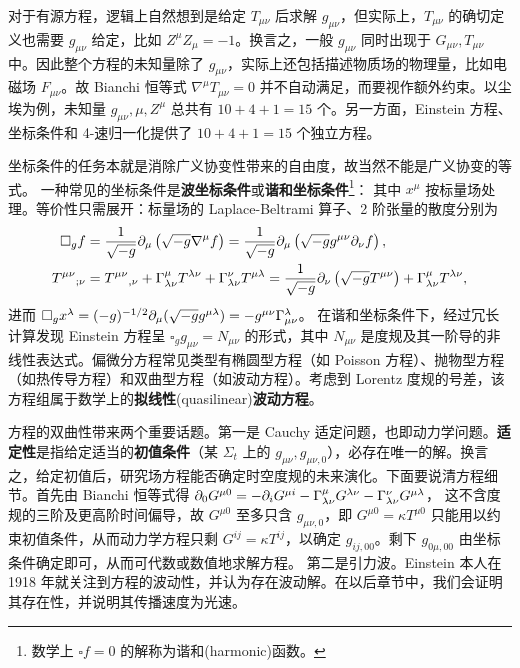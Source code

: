 对于有源方程，逻辑上自然想到是给定 $T_{\mu\nu}$ 后求解 $g_{\mu\nu}$，但实际上，$T_{\mu\nu}$ 的确切定义也需要 $g_{\mu\nu}$ 给定，比如 $Z^\mu Z_\mu = -1$。换言之，一般 $g_{\mu\nu}$ 同时出现于 $G_{\mu\nu},T_{\mu\nu}$ 中。因此整个方程的未知量除了 $g_{\mu\nu}$，实际上还包括描述物质场的物理量，比如电磁场 $F_{\mu\nu}$。故 Bianchi 恒等式 $\nabla^\mu T_{\mu\nu}=0$ 并不自动满足，而要视作额外约束。以尘埃为例，未知量 $g_{\mu\nu},\mu,Z^\mu$ 总共有 $10+4+1=15$ 个。另一方面，Einstein 方程、坐标条件和 4-速归一化提供了 $10+4+1=15$ 个独立方程。

坐标条件的任务本就是消除广义协变性带来的自由度，故当然不能是广义协变的等式。
一种常见的坐标条件是\textbf{波坐标条件}或\textbf{谐和坐标条件}\footnote{数学上 $\square f = 0$ 的解称为谐和(harmonic)函数。}：
其中 $x^\mu$ 按标量场处理。等价性只需展开：标量场的 Laplace-Beltrami 算子、2 阶张量的散度分别为
\begin{align}
    \square_g f&=\frac{1}{\sqrt{-g}} \partial_\mu\left(\sqrt{-g} \nabla^\mu f\right)=\frac{1}{\sqrt{-g}} \partial_\mu\left(\sqrt{-g} g^{\mu\nu}\partial_\nu f\right),\\ 
T^{\mu \nu}{}_{;\nu}&=T^{\mu \nu}{}_{,\nu}+\Gamma_{\lambda \nu}^\mu T^{\lambda \nu}+\Gamma_{\lambda \nu}^\nu T^{\mu \lambda}
=\frac{1}{\sqrt{-g}} \partial_\nu\left(\sqrt{-g} T^{\mu \nu}\right)+\Gamma_{\lambda \nu}^\mu T^{\lambda \nu},
\end{align}
进而 $\square_g x^\lambda=(-g)^{-1/2}\partial_\mu(\sqrt{-g} g^{\mu\lambda})=-g^{\mu\nu}\Gamma^\lambda_{\mu\nu}$。
在谐和坐标条件下，经过冗长计算发现 Einstein 方程呈 $\square_gg_{\mu\nu}=N_{\mu\nu}$ 的形式，其中 $N_{\mu\nu}$ 是度规及其一阶导的非线性表达式。偏微分方程常见类型有椭圆型方程（如 Poisson 方程）、抛物型方程（如热传导方程）和双曲型方程（如波动方程）。考虑到 Lorentz 度规的号差，该方程组属于数学上的\textbf{拟线性}(quasilinear)\textbf{波动方程}。




方程的双曲性带来两个重要话题。第一是 Cauchy 适定问题，也即动力学问题。\textbf{适定性}是指给定适当的\textbf{初值条件}（某 $\Sigma_t$ 上的 $g_{\mu\nu},g_{\mu\nu,0}$），必存在唯一的解。换言之，给定初值后，研究场方程能否确定时空度规的未来演化。下面要说清方程细节。首先由 Bianchi 恒等式得
$\partial_0 G^{\mu 0} =-\partial_i G^{\mu i} - \Gamma^\mu_{\lambda\nu} G^{\lambda\nu} - \Gamma^\nu_{\lambda\nu} G^{\mu\lambda}$，
这不含度规的三阶及更高阶时间偏导，故 $G^{\mu 0}$ 至多只含 $g_{\mu\nu,0}$，即 $G^{\mu 0} =\kappa T^{\mu 0}$ 只能用以约束初值条件，从而动力学方程只剩 $G^{ij} =\kappa T^{ij}$，以确定 $g_{ij,00}$。剩下 $g_{0\mu,00}$ 由坐标条件确定即可，从而可代数或数值地求解方程。
第二是引力波。Einstein 本人在 1918 年就关注到方程的波动性，并认为存在波动解。在以后章节中，我们会证明其存在性，并说明其传播速度为光速。

